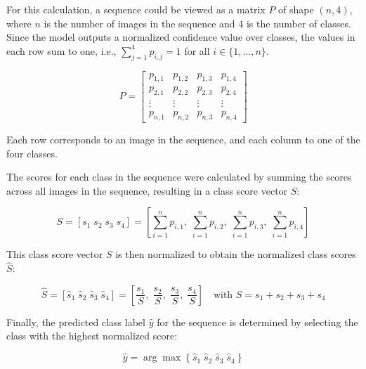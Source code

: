     For this calculation, a sequence could be viewed as a matrix \( P \) of shape \((n, 4)\), where \(n\) is the number of images in the sequence and 4 is the number of classes.
    Since the model outputs a normalized confidence value over classes, the values in each row sum to one, i.e., \( \sum_{j=1}^{4} p_{i,j} = 1 \) for all \( i \in \{1, \ldots, n\} \).

    \begin{equation}
    P = 
    \begin{bmatrix}
    p_{1,1} & p_{1,2} & p_{1,3} & p_{1,4} \\
    p_{2,1} & p_{2,2} & p_{2,3} & p_{2,4} \\
    \vdots  & \vdots  & \vdots  & \vdots  \\
    p_{n,1} & p_{n,2} & p_{n,3} & p_{n,4}
    \end{bmatrix}
    \label{eq:sequence_matrix}
    \end{equation}

    Each row corresponds to an image in the sequence, and each column to one of the four classes.

    The scores for each class in the sequence were calculated by summing the scores across all images in the sequence, resulting in a class score vector \( S \):

    \begin{equation}
    S = [s_1\; s_2\; s_3\; s_4] = \left[ \sum_{i=1}^n p_{i,1},\; \sum_{i=1}^n p_{i,2},\; \sum_{i=1}^n p_{i,3},\; \sum_{i=1}^n p_{i,4} \right]
    \label{eq:class_score_vector}
    \end{equation}

    This class score vector \( S \) is then normalized to obtain the normalized class scores \( \hat{S} \):

    \begin{equation}
    \hat{S} = [\hat{s}_1\; \hat{s}_2\; \hat{s}_3\; \hat{s}_4] = \left[ \frac{s_1}{S},\; \frac{s_2}{S},\; \frac{s_3}{S},\; \frac{s_4}{S} \right]
    \quad \text{with } S = s_1 + s_2 + s_3 + s_4
    \label{eq:normalized_class_scores}
    \end{equation}

    Finally, the predicted class label \( \hat{y} \) for the sequence is determined by selecting the class with the highest normalized score:

    \begin{equation}
    \hat{y} = \arg\max \left\{\hat{s}_1\; \hat{s}_2\; \hat{s}_3\; \hat{s}_4\right\}
    \label{eq:predicted_sequence_label}
    \end{equation}

